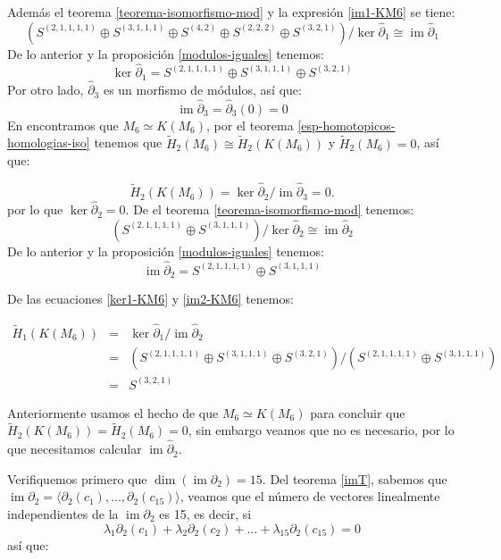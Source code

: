 \documentclass[12pt]{book}
\theoremstyle{definition}
\DeclareMathOperator{\im}{im}
\newcounter{in}
\begin{document}
Además el teorema \ref{teorema-isomorfismo-mod} y la expresión \ref{im1-KM6} se tiene:
$$(S^{(2,1,1,1,1)}\oplus S^{(3,1,1,1)}\oplus S^{(4,2)}\oplus
      S^{(2,2,2)}\oplus S^{(3,2,1)})/\ker \widehat\partial_{1}\cong \im \widehat\partial_{1}$$
De lo anterior y la proposición \ref{modulos-iguales} tenemos:
\begin{equation}
\label{ker1-KM6}
\ker \widehat\partial_{1}=S^{(2,1,1,1,1)}\oplus S^{(3,1,1,1)}\oplus S^{(3,2,1)}
\end{equation}
Por otro lado, $\widehat\partial_{3}$ es un morfismo de módulos, así que:
\begin{equation*}
\im\widehat\partial_{3}=\widehat\partial_{3}(0)=0
\label{im3-KM6}
\end{equation*}
En \cite{larrion2009clique} encontramos que $M_{6}\simeq K(M_{6})$,
por el teorema \ref{esp-homotopicos-homologias-iso} tenemos que
$\widetilde H_{2}(M_{6})\cong \widetilde H_{2}(K(M_{6}))$ y  $\widetilde
H_{2}(M_{6})=0$, así que:

\begin{equation*}
\widetilde H_{2}(K(M_{6}))=\ker \widehat\partial_{2}/\im \widehat\partial_{3}=0.
\end{equation*}
por lo que $\ker \widehat\partial_{2}=0$. De el teorema
\ref{teorema-isomorfismo-mod} tenemos:
$$(S^{(2,1,1,1,1)}\oplus S^{(3,1,1,1)})/\ker \widehat\partial_{2}\cong \im
\widehat\partial_{2}$$
De lo anterior y la proposición \ref{modulos-iguales} tenemos:
\begin{equation}
\im \widehat\partial_{2}=S^{(2,1,1,1,1)}\oplus S^{(3,1,1,1)}
\label{im2-KM6}
\end{equation}

De las ecuaciones \ref{ker1-KM6} y \ref{im2-KM6} tenemos:

\begin{eqnarray*}
  \widetilde H_{1}(K(M_{6}))&=&\ker \widehat\partial_{1}/\im
  \widehat\partial_{2}\\
  &=&(S^{(2,1,1,1,1)}\oplus S^{(3,1,1,1)}\oplus
  S^{(3,2,1)})/(S^{(2,1,1,1,1)}\oplus S^{(3,1,1,1)})\\
  &=&S^{(3,2,1)}
\end{eqnarray*}




Anteriormente usamos el hecho de que $M_{6}\simeq K(M_{6})$  para
concluir que $\widetilde H_{2}(K(M_{6}))=\widetilde H_{2}(M_{6})=0$, sin embargo veamos que no es necesario, por lo que
necesitamos calcular $\im \widehat\partial_{2}$. 

Verifiquemos primero que $\dim(\im \partial_{2})=15$. Del teorema
\ref{imT}, sabemos que
$\im \partial_{2}=\langle\partial_{2}(c_{1}),\ldots,\partial_{2}(c_{15})\rangle$,
veamos que el número de vectores linealmente independientes de la
$\im \partial_{2}$ es 15, es
decir, si
$$\lambda_{1}\partial_{2}(c_{1})+\lambda_{2}\partial_{2}(c_{2})+\ldots+\lambda_{15}\partial_{2}(c_{15})=0$$
así que:
\end{document}
